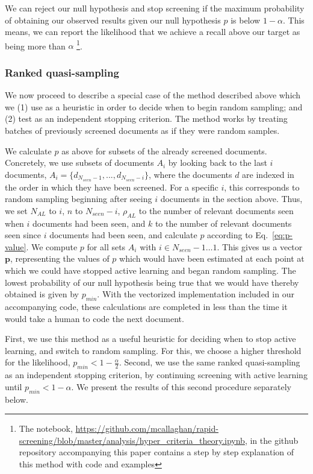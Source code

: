 \documentclass{bmcart}
\begin{document}
	We can reject our null hypothesis and stop screening if the maximum probability of obtaining our observed results given our null hypothesis $p$ is below $1-\alpha$. This means, we can report the likelihood that we achieve a recall above our target as being more than $\alpha$ \footnote{The notebook, \url{https://github.com/mcallaghan/rapid-screening/blob/master/analysis/hyper_criteria_theory.ipynb}, in the github repository accompanying this paper contains a step by step explanation of this method with code and examples}.
	
	
	
	\subsubsection*{Ranked quasi-sampling}
	
	We now proceed to describe a special case of the method described above which we (1) use as a heuristic in order to decide when to begin random sampling; and (2) test as an independent stopping criterion. The method works by treating batches of previously screened documents as if they were random samples.
	
	We calculate $p$ as above for subsets of the already screened documents. Concretely, we use subsets of documents $A_i$ by looking back to the last $i$ documents, $A_i = \{d_{N_{seen} - 1}, ..., d_{N_{seen} - i}\}$, where the documents $d$ are indexed in the order in which they have been screened. For a specific $i$, this corresponds to  random sampling beginning after seeing $i$ documents in the section above.
	Thus, we set 
	$N_{AL}$ to $i$, 
	$n$ to $N_{seen}-i$, 
	$\rho_{AL}$ to the number of relevant documents seen when $i$ documents had been seen,
	and $k$ to the number of relevant documents seen since $i$ documents had been seen, and calculate $p$ according to Eq.~\ref{eq:p-value}.
	We compute $p$ for all sets $A_i$ with $i \in {N_{seen}-1 \dots 1}$.
	This gives us a vector $\bm{p}$, representing the values of $p$ which would have been estimated at each point at which we could have stopped active learning and began random sampling. The lowest probability of our null hypothesis being true that we would have thereby obtained is given by $p_{min}$. With the vectorized implementation included in our accompanying code, these calculations are completed in less than the time it would take a human to code the next document.
	
	First, we use this method as a useful heuristic for deciding when to stop active learning, and switch to random sampling. For this, we choose a higher threshold for the likelihood, $p_{min} < 1-\frac{\alpha}{2}$. Second, we use the same ranked quasi-sampling as an independent stopping criterion, by continuing screening with active learning until $p_{min} < 1 - \alpha$. We present the results of this second procedure separately below.
	
\end{document}
